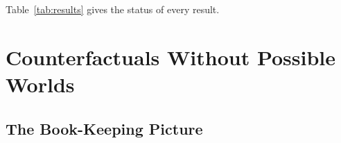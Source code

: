 \documentclass[11pt]{article}
\theoremstyle{definition}
\begin{document}
\noindent Table~\ref{tab:results} gives the status of every result.

\section{Counterfactuals Without Possible Worlds}\label{sec:semantics}

\subsection{The Book-Keeping Picture}\label{sec:books}
\end{document}
